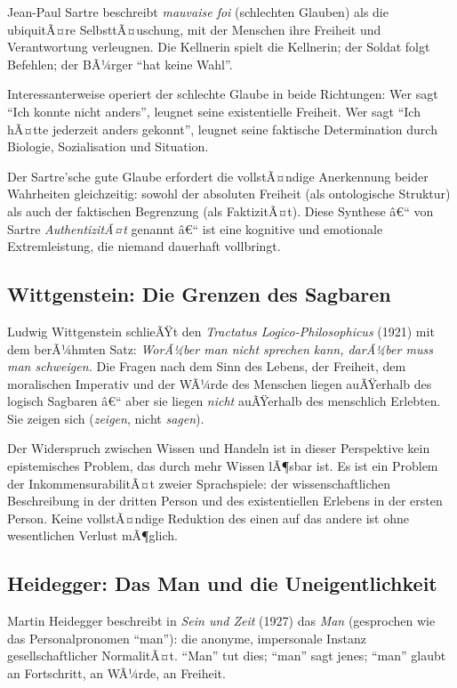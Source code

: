 ﻿\documentclass[12pt, a4paper]{article}
\begin{document}
Jean-Paul Sartre beschreibt \emph{mauvaise foi} (schlechten Glauben) als die
ubiquitÃ¤re SelbsttÃ¤uschung, mit der Menschen ihre Freiheit und Verantwortung
verleugnen. Die Kellnerin spielt die Kellnerin; der Soldat folgt Befehlen;
der BÃ¼rger \enquote{hat keine Wahl}.

Interessanterweise operiert der schlechte Glaube in beide Richtungen: Wer sagt
\enquote{Ich konnte nicht anders}, leugnet seine existentielle Freiheit. Wer sagt
\enquote{Ich hÃ¤tte jederzeit anders gekonnt}, leugnet seine faktische Determination
durch Biologie, Sozialisation und Situation.

Der Sartre'sche gute Glaube erfordert die vollstÃ¤ndige Anerkennung beider Wahrheiten
gleichzeitig: sowohl der absoluten Freiheit (als ontologische Struktur) als auch
der faktischen Begrenzung (als FaktizitÃ¤t). Diese Synthese â€“ von Sartre
\emph{AuthentizitÃ¤t} genannt â€“ ist eine kognitive und emotionale Extremleistung,
die niemand dauerhaft vollbringt.

\subsection{Wittgenstein: Die Grenzen des Sagbaren}

Ludwig Wittgenstein schlieÃŸt den \textit{Tractatus Logico-Philosophicus} (1921)
mit dem berÃ¼hmten Satz: \textit{WorÃ¼ber man nicht sprechen kann, darÃ¼ber muss man
schweigen.} Die Fragen nach dem Sinn des Lebens, der Freiheit, dem moralischen
Imperativ und der WÃ¼rde des Menschen liegen auÃŸerhalb des logisch Sagbaren â€“
aber sie liegen \emph{nicht} auÃŸerhalb des menschlich Erlebten. Sie zeigen sich
(\emph{zeigen}, nicht \emph{sagen}).

Der Widerspruch zwischen Wissen und Handeln ist in dieser Perspektive kein
epistemisches Problem, das durch mehr Wissen lÃ¶sbar ist. Es ist ein Problem
der InkommensurabilitÃ¤t zweier Sprachspiele: der wissenschaftlichen Beschreibung
in der dritten Person und des existentiellen Erlebens in der ersten Person.
Keine vollstÃ¤ndige Reduktion des einen auf das andere ist ohne wesentlichen
Verlust mÃ¶glich.

\subsection{Heidegger: Das Man und die Uneigentlichkeit}

Martin Heidegger beschreibt in \textit{Sein und Zeit} (1927) das \emph{Man}
(gesprochen wie das Personalpronomen \enquote{man}): die anonyme, impersonale
Instanz gesellschaftlicher NormalitÃ¤t. \enquote{Man} tut dies; \enquote{man}
sagt jenes; \enquote{man} glaubt an Fortschritt, an WÃ¼rde, an Freiheit.
\end{document}
